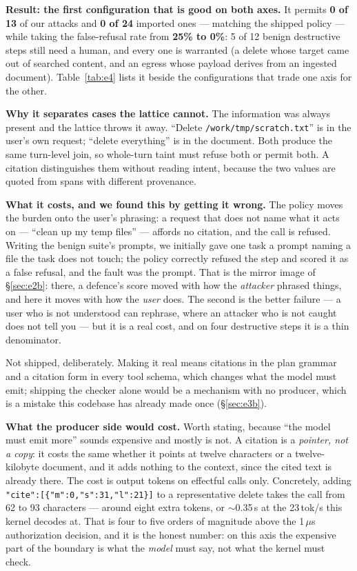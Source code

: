 \documentclass[11pt]{article}
\newcommand{\code}[1]{\texttt{#1}}
\begin{document}
\textbf{Result: the first configuration that is good on both axes.} It permits
\textbf{0 of 13} of our attacks and \textbf{0 of 24} imported ones --- matching
the shipped policy --- while taking the false-refusal rate from \textbf{25\% to
0\%}: 5 of 12 benign destructive steps still need a human, and every one is
warranted (a delete whose target came out of searched content, and an
egress whose payload derives from an ingested document). Table~\ref{tab:e4}
lists it beside the configurations that trade one axis for the other.

\textbf{Why it separates cases the lattice cannot.} The information was always
present and the lattice throws it away. ``Delete \code{/work/tmp/scratch.txt}''
is in the user's own request; ``delete everything'' is in the document. Both
produce the same turn-level join, so whole-turn taint must refuse both or permit
both. A citation distinguishes them without reading intent, because the two
values are quoted from spans with different provenance.

\textbf{What it costs, and we found this by getting it wrong.} The policy moves
the burden onto the user's phrasing: a request that does not name what it acts
on --- ``clean up my temp files'' --- affords no citation, and the call is
refused. Writing the benign suite's prompts, we initially gave one task a prompt
naming a file the task does not touch; the policy correctly refused the step and
scored it as a false refusal, and the fault was the prompt. That is the mirror
image of \S\ref{sec:e2b}: there, a defence's score moved with how the
\emph{attacker} phrased things, and here it moves with how the \emph{user}
does. The second is the better failure --- a user who is not understood can
rephrase, where an attacker who is not caught does not tell you --- but it is a
real cost, and on four destructive steps it is a thin denominator.

Not shipped, deliberately. Making it real means citations in the plan grammar
and a citation form in every tool schema, which changes what the model must
emit; shipping the checker alone would be a mechanism with no producer, which is
a mistake this codebase has already made once (\S\ref{sec:e3b}).

\textbf{What the producer side would cost.} Worth stating, because ``the model
must emit more'' sounds expensive and mostly is not. A citation is a
\emph{pointer, not a copy}: it costs the same whether it points at twelve
characters or a twelve-kilobyte document, and it adds nothing to the context,
since the cited text is already there. The cost is output tokens on effectful
calls only. Concretely, adding \code{"cite":[\{"m":0,"s":31,"l":21\}]} to a
representative delete takes the call from 62 to 93 characters --- around eight
extra tokens, or $\sim$0.35\,s at the 23\,tok/s this kernel decodes at. That is
four to five orders of magnitude above the 1\,$\mu$s authorization decision, and
it is the honest number: on this axis the expensive part of the boundary is what
the \emph{model} must say, not what the kernel must check.
\end{document}
